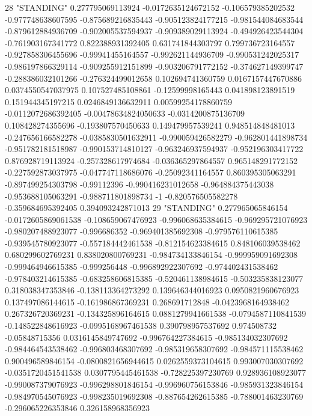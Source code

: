 28 "STANDING" 0.277795069113924 -0.0172635124672152 -0.106579385202532 -0.977748638607595 -0.875689216835443 -0.905123824177215 -0.981544084683544 -0.879612884936709 -0.902005537594937 -0.909389029113924 -0.494926423544304 -0.761903167341772 0.822388931392405 0.631741844303797 0.799736723164557 -0.927858306455696 -0.99941455164557 -0.992621144936709 -0.990531242025317 -0.986197866329114 -0.909255912151899 -0.903206791772152 -0.374627149399747 -0.288386032101266 -0.276324499012658 0.102694741360759 0.0167157447670886 0.0374550547037975 0.107527485108861 -0.12599998165443 0.041898123891519 0.151944345197215 0.0246849136632911 0.00599254178860759 -0.0112072686392405 -0.00478634824050633 -0.0314200875136709 0.108428274355696 -0.193807570450633 0.149479957539241 0.948514848481013 -0.247656166582278 -0.0385830501632911 -0.990059426582279 -0.962801441898734 -0.951782181518987 -0.990153714810127 -0.963246937594937 -0.952196303417722 0.876928719113924 -0.257328617974684 -0.036365297864557 0.965148291772152 -0.227592873037975 -0.047747118686076 -0.25092341164557 0.860395305063291 -0.897499254303798 -0.99112396 -0.990416231012658 -0.964884375443038 -0.953688105063291 -0.988711801898734 -1 -0.820576505582278 -0.359684695392405 0.394093242871013
29 "STANDING" 0.277965065846154 -0.0172605869061538 -0.108659067476923 -0.996068635384615 -0.969295721076923 -0.980207488923077 -0.996686352 -0.969401385692308 -0.979576110615385 -0.939545780923077 -0.557184442461538 -0.812154623384615 0.848106039538462 0.680299602769231 0.838020800769231 -0.984734133846154 -0.999959091692308 -0.999464946615385 -0.999256448 -0.996892922307692 -0.974402431538462 -0.978403214615385 -0.683258606815385 -0.520461138984615 -0.503235838123077 0.318038347353846 -0.138113364273292 0.139646344016923 0.0950821960676923 0.137497086144615 -0.161986867369231 0.268691712848 -0.0423968164938462 0.267326720369231 -0.134325896164615 0.0881279941661538 -0.0794587110841539 -0.148522848616923 -0.0995168967461538 0.390798957537692 0.974508732 -0.05848715356 0.0316145849747692 -0.996764227384615 -0.985134032307692 -0.984464543538462 -0.996803468307692 -0.985319658307692 -0.984571115538462 0.900496589846154 -0.0800821656944615 0.0262559373104615 0.993007030307692 -0.0351720451541538 0.0307795445461538 -0.728225397230769 0.928936108923077 -0.990087379076923 -0.996298801846154 -0.996960756153846 -0.985931323846154 -0.984970545076923 -0.998235019692308 -0.887654262615385 -0.788001463230769 -0.296065226353846 0.326158968356923
